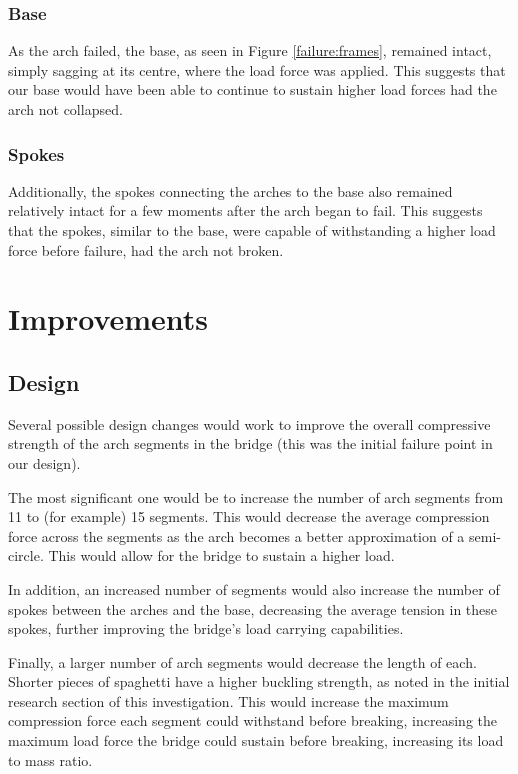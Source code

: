\documentclass[a4paper,11pt]{article}
\begin{document}
\subsubsection{Base}

As the arch failed, the base, as seen in Figure \ref{failure:frames}, remained
intact, simply sagging at its centre, where the load force was applied.
This suggests that our base would have been able to continue to sustain higher
load forces had the arch not collapsed.


\subsubsection{Spokes}

Additionally, the spokes connecting the arches to the base also remained
relatively intact for a few moments after the arch began to fail.
This suggests that the spokes, similar to the base, were capable of withstanding
a higher load force before failure, had the arch not broken.




\section{Improvements}

\subsection{Design}

Several possible design changes would work to improve the overall compressive
strength of the arch segments in the bridge (this was the initial failure
point in our design).

The most significant one would be to increase the number of arch segments from
11 to (for example) 15 segments.
This would decrease the average compression force across the segments as the
arch becomes a better approximation of a semi-circle.
This would allow for the bridge to sustain a higher load.

In addition, an increased number of segments would also increase the number of
spokes between the arches and the base, decreasing the average tension in these
spokes, further improving the bridge's load carrying capabilities.

Finally, a larger number of arch segments would decrease the length of each.
Shorter pieces of spaghetti have a higher buckling strength, as noted in the
initial research section of this investigation.
This would increase the maximum compression force each segment could withstand
before breaking, increasing the maximum load force the bridge could sustain
before breaking, increasing its load to mass ratio.
\end{document}
